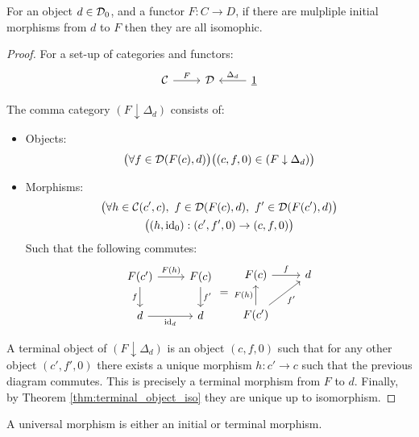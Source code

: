 \begin{theorem}
	For an object $d\in \mathcal{D}_0$, and a functor $F:C\to D$, if there are mulpliple
	initial morphisms from $d$ to $F$ then they are all isomophic.

	\begin{proof}
		For a set-up of categories and functors:
		\[\begin{tikzcd}[ampersand replacement=\&]
			\C \& \D \& {\underline{1}}
			\arrow["F", from=1-1, to=1-2]
			\arrow["{\Delta_d}"', from=1-3, to=1-2]
		\end{tikzcd}\]

		The comma category $(F \downarrow \Delta_d)$ consists of:
		\begin{itemize}
			\item Objects:
				\[
					\big(\forall f\in \mathcal{D}(F(c), d)\big)
					\big((c, f, 0) \in (F\downarrow \Delta _d)\big)
				\]
			\item Morphisms:
				\[
					\begin{gathered}
						\big(\forall h\in \mathcal{C}(c', c)
							,\ f\in \mathcal{D}(F(c), d),\ f'\in\mathcal{D}(F(c'), d)\big)\\
						\big((h, \mathrm{id}_0): (c', f', 0) \to (c, f, 0)\big)
					\end{gathered}
				\]
				Such that the following commutes:
				\[\begin{tikzcd}
					{F(c')} & {F(c)} \\
					d & d
					\arrow["{F(h)}", from=1-1, to=1-2]
					\arrow["{\mathrm{id}_d}"', from=2-1, to=2-2]
					\arrow["f"', from=1-1, to=2-1]
					\arrow["{f'}", from=1-2, to=2-2]
				\end{tikzcd}
				=
				\begin{tikzcd}
					{F(c)} & d \\
					{F(c')}
					\arrow["{F(h)}", from=2-1, to=1-1]
					\arrow["{f'}"', from=2-1, to=1-2]
					\arrow["f", from=1-1, to=1-2]
				\end{tikzcd}\]
		\end{itemize}
		A terminal object of $(F\downarrow \Delta_d)$ is an object $(c,f,0)$ such
		that for any other object $(c', f', 0)$ there exists a unique morphism $h:c'
		\to c$ such that the previous diagram commutes. This is precisely a terminal
		morphism from $F$ to $d$. Finally, by Theorem \ref{thm:terminal_object_iso}
		they are unique up to isomorphism.
	\end{proof}
\end{theorem}

\begin{definition}
	A universal morphism is either an initial or terminal morphism.
	\parencite{lane:working_mathematician}
\end{definition}

